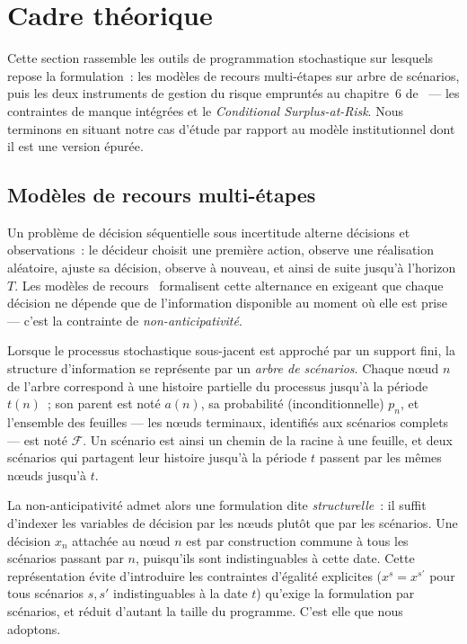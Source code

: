 \documentclass[11pt,letterpaper]{article}
\theoremstyle{definition}
\begin{document}
\section{Cadre théorique}\label{sec:cadre}

Cette section rassemble les outils de programmation stochastique sur lesquels
repose la formulation~: les modèles de recours multi-étapes sur arbre de scénarios,
puis les deux instruments de gestion du risque empruntés au chapitre~6
de~\cite{KHvdVR2020} --- les contraintes de manque intégrées et le
\emph{Conditional Surplus-at-Risk}. Nous terminons en situant notre cas d'étude par
rapport au modèle institutionnel dont il est une version épurée.

\subsection{Modèles de recours multi-étapes}\label{ssec:recours}

Un problème de décision séquentielle sous incertitude alterne décisions et
observations~: le décideur choisit une première action, observe une réalisation
aléatoire, ajuste sa décision, observe à nouveau, et ainsi de suite jusqu'à
l'horizon $T$. Les modèles de recours~\cite[chap.~1--3]{KHvdVR2020} formalisent
cette alternance en exigeant que chaque décision ne dépende que de l'information
disponible au moment où elle est prise --- c'est la contrainte de
\emph{non-anticipativité}.

Lorsque le processus stochastique sous-jacent est approché par un support fini, la
structure d'information se représente par un \emph{arbre de scénarios}. Chaque
n\oe ud $n$ de l'arbre correspond à une histoire partielle du processus jusqu'à la
période $t(n)$~; son parent est noté $a(n)$, sa probabilité (inconditionnelle)
$p_n$, et l'ensemble des feuilles --- les n\oe uds terminaux, identifiés aux
scénarios complets --- est noté $\mathcal F$. Un scénario est ainsi un chemin de la
racine à une feuille, et deux scénarios qui partagent leur histoire jusqu'à la
période $t$ passent par les mêmes n\oe uds jusqu'à $t$.

La non-anticipativité admet alors une formulation dite \emph{structurelle}~: il
suffit d'indexer les variables de décision par les n\oe uds plutôt que par les
scénarios. Une décision $x_n$ attachée au n\oe ud $n$ est par construction commune à
tous les scénarios passant par $n$, puisqu'ils sont indistinguables à cette date.
Cette représentation évite d'introduire les contraintes d'égalité explicites
($x^s = x^{s'}$ pour tous scénarios $s, s'$ indistinguables à la date $t$) qu'exige
la formulation par scénarios, et réduit d'autant la taille du programme. C'est elle
que nous adoptons.
\end{document}
